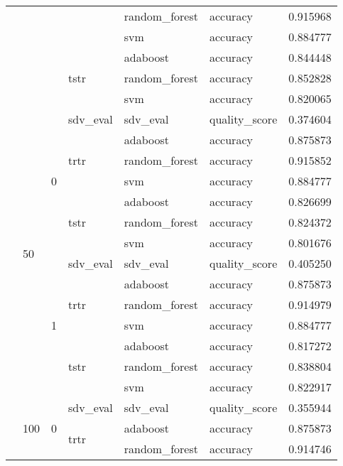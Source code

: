 \begin{longtable}{llllllr}
 &  &  &  & random_forest & accuracy & 0.915968 \\
\cline{5-7}
 &  &  &  & svm & accuracy & 0.884777 \\
\cline{4-7} \cline{5-7}
 &  &  & \multirow[t]{3}{*}{tstr} & adaboost & accuracy & 0.844448 \\
\cline{5-7}
 &  &  &  & random_forest & accuracy & 0.852828 \\
\cline{5-7}
 &  &  &  & svm & accuracy & 0.820065 \\
\cline{2-7} \cline{3-7} \cline{4-7} \cline{5-7}
 & \multirow[t]{14}{*}{50} & \multirow[t]{7}{*}{0} & sdv_eval & sdv_eval & quality_score & 0.374604 \\
\cline{4-7} \cline{5-7}
 &  &  & \multirow[t]{3}{*}{trtr} & adaboost & accuracy & 0.875873 \\
\cline{5-7}
 &  &  &  & random_forest & accuracy & 0.915852 \\
\cline{5-7}
 &  &  &  & svm & accuracy & 0.884777 \\
\cline{4-7} \cline{5-7}
 &  &  & \multirow[t]{3}{*}{tstr} & adaboost & accuracy & 0.826699 \\
\cline{5-7}
 &  &  &  & random_forest & accuracy & 0.824372 \\
\cline{5-7}
 &  &  &  & svm & accuracy & 0.801676 \\
\cline{3-7} \cline{4-7} \cline{5-7}
 &  & \multirow[t]{7}{*}{1} & sdv_eval & sdv_eval & quality_score & 0.405250 \\
\cline{4-7} \cline{5-7}
 &  &  & \multirow[t]{3}{*}{trtr} & adaboost & accuracy & 0.875873 \\
\cline{5-7}
 &  &  &  & random_forest & accuracy & 0.914979 \\
\cline{5-7}
 &  &  &  & svm & accuracy & 0.884777 \\
\cline{4-7} \cline{5-7}
 &  &  & \multirow[t]{3}{*}{tstr} & adaboost & accuracy & 0.817272 \\
\cline{5-7}
 &  &  &  & random_forest & accuracy & 0.838804 \\
\cline{5-7}
 &  &  &  & svm & accuracy & 0.822917 \\
\cline{2-7} \cline{3-7} \cline{4-7} \cline{5-7}
 & \multirow[t]{14}{*}{100} & \multirow[t]{7}{*}{0} & sdv_eval & sdv_eval & quality_score & 0.355944 \\
\cline{4-7} \cline{5-7}
 &  &  & \multirow[t]{3}{*}{trtr} & adaboost & accuracy & 0.875873 \\
\cline{5-7}
 &  &  &  & random_forest & accuracy & 0.914746 \\

\end{longtable}
